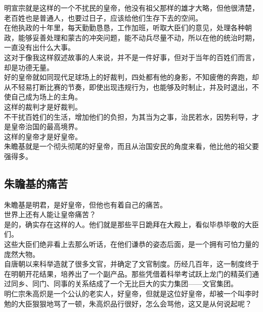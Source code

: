 \begin{multicols}{\theparacolNo}
明宣宗就是这样的一个不扰民的皇帝，他没有祖父那样的雄才大略，但他很清楚，老百姓也是普通人，也要过日子，应该给他们生存下去的空间。\\

在他执政的十年里，每天勤勤恳恳，工作加班，听取大臣们的意见，处理各种朝政，能够妥善处理和蒙古的冲突问题，能不动兵尽量不动，所以在他的统治时期，一直没有出什么大事。\\

这对于像我这样叙述故事的人来说，并不是一件好事，但对于当年的百姓们而言，却是功德无量。\\

好的皇帝就如同现代足球场上的好裁判，四处都有他的身影，不知疲倦的奔跑，却从不轻易打断比赛的节奏，即使出现违规行为，也能够及时制止，并及时退出，不使自己成为场上的主角。\\

这样的裁判才是好裁判。\\

不干扰百姓们的生活，增加他们的负担，为其当为之事，治民若水，因势利导，才是皇帝治国的最高境界。\\

这样的皇帝才是好皇帝。\\

朱瞻基就是一个彻头彻尾的好皇帝，而且从治国安民的角度来看，他比他的祖父要强得多。\\

\subsection{朱瞻基的痛苦}
朱瞻基是明君，是好皇帝，但他也有着自己的痛苦。\\

世界上还有人能让皇帝痛苦？\\

是的，确实存在这样的人。他们就是那些平日跪拜在大殿上，看似毕恭毕敬的大臣们。\\

这些大臣们绝非看上去那么听话，在他们谦恭的姿态后面，是一个拥有可怕力量的庞然大物。\\

自唐朝以来科举造就了很多文官，并确定了文官制度。历经几百年，这一制度终于在明朝开花结果，培养出了一个副产品。那些凭借着科举考试跃上龙门的精英们通过同乡、同门、同事的关系结成了一个无比巨大的实力集团——文官集团。\\

明仁宗朱高炽是一个公认的老实人，好皇帝，但就是这位好皇帝，却被一个叫李时勉的大臣狠狠地骂了一顿，朱高炽品行很好，怎么会骂他，这又是从何说起呢？\\


\end{multicols}
